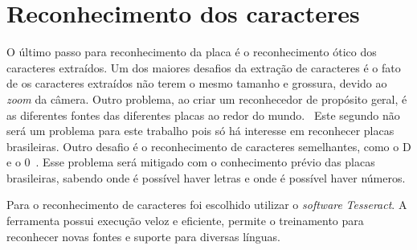 \section{Reconhecimento dos caracteres} \label{sec:reconhecimento}

O último passo para reconhecimento da placa é o reconhecimento ótico dos
caracteres extraídos. Um dos maiores desafios da extração de caracteres é o fato de
os caracteres extraídos não terem o mesmo tamanho e grossura, devido ao
\emph{zoom} da câmera. Outro problema, ao criar um reconhecedor de propósito
geral, é as diferentes fontes das diferentes placas ao redor do mundo.~\cite{s2013automatic}
Este segundo não será um problema para este trabalho pois
só há interesse em reconhecer placas brasileiras. Outro desafio é o
reconhecimento de caracteres semelhantes, como o D e o
0~\cite{ho2016intelligent}.  Esse problema será mitigado com o conhecimento
prévio das placas brasileiras, sabendo onde é possível haver letras e onde é
possível haver números.

Para o reconhecimento de caracteres foi escolhido utilizar o \emph{software}
\emph{Tesseract}. A ferramenta possui execução veloz e eficiente, permite o
treinamento para reconhecer novas fontes e suporte para diversas línguas.
